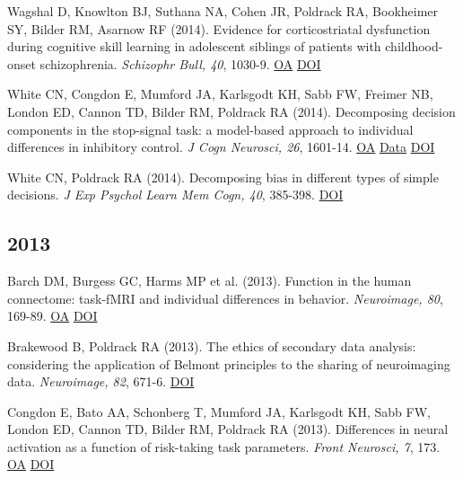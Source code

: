 \documentclass[10pt, letterpaper]{article}
\begin{document}
Wagshal D, Knowlton BJ, Suthana NA, Cohen JR, Poldrack RA, Bookheimer SY, Bilder RM, Asarnow RF (2014). Evidence for corticostriatal dysfunction during cognitive skill learning in adolescent siblings of patients with childhood-onset schizophrenia. \textit{Schizophr Bull, 40}, 1030-9. \href{https://www.ncbi.nlm.nih.gov/pmc/articles/PMC4133665}{OA} \href{http://dx.doi.org/10.1093/schbul/sbt147}{DOI} \vspace{2mm}

White CN, Congdon E, Mumford JA, Karlsgodt KH, Sabb FW, Freimer NB, London ED, Cannon TD, Bilder RM, Poldrack RA (2014). Decomposing decision components in the stop-signal task: a model-based approach to individual differences in inhibitory control. \textit{J Cogn Neurosci, 26}, 1601-14. \href{https://www.ncbi.nlm.nih.gov/pmc/articles/PMC4119005}{OA} \href{https://openneuro.org/datasets/ds000030/versions/1.0.0}{Data} \href{http://dx.doi.org/10.1162/jocn_a_00567}{DOI} \vspace{2mm}

White CN, Poldrack RA (2014). Decomposing bias in different types of simple decisions. \textit{J Exp Psychol Learn Mem Cogn, 40}, 385-398. \href{http://dx.doi.org/10.1037/a0034851}{DOI} \vspace{2mm}

\subsection*{2013}Barch DM, Burgess GC, Harms MP et al. (2013). Function in the human connectome: task-fMRI and individual differences in behavior. \textit{Neuroimage, 80}, 169-89. \href{https://www.ncbi.nlm.nih.gov/pmc/articles/PMC4011498}{OA} \href{http://dx.doi.org/10.1016/j.neuroimage.2013.05.033}{DOI} \vspace{2mm}

Brakewood B, Poldrack RA (2013). The ethics of secondary data analysis: considering the application of Belmont principles to the sharing of neuroimaging data. \textit{Neuroimage, 82}, 671-6. \href{http://dx.doi.org/10.1016/j.neuroimage.2013.02.040}{DOI} \vspace{2mm}

Congdon E, Bato AA, Schonberg T, Mumford JA, Karlsgodt KH, Sabb FW, London ED, Cannon TD, Bilder RM, Poldrack RA (2013). Differences in neural activation as a function of risk-taking task parameters. \textit{Front Neurosci, 7}, 173. \href{https://www.ncbi.nlm.nih.gov/pmc/articles/PMC3786224}{OA} \href{http://dx.doi.org/10.3389/fnins.2013.00173}{DOI} \vspace{2mm}
\end{document}
